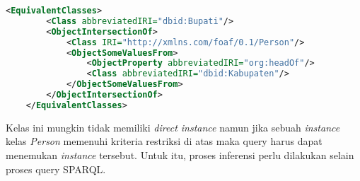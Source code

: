 \begin{lstlisting}[language=XML,xleftmargin=0pt]
    <EquivalentClasses>
        <Class abbreviatedIRI="dbid:Bupati"/>
        <ObjectIntersectionOf>
            <Class IRI="http://xmlns.com/foaf/0.1/Person"/>
            <ObjectSomeValuesFrom>
                <ObjectProperty abbreviatedIRI="org:headOf"/>
                <Class abbreviatedIRI="dbid:Kabupaten"/>
            </ObjectSomeValuesFrom>
        </ObjectIntersectionOf>
    </EquivalentClasses>
\end{lstlisting}

Kelas ini mungkin tidak memiliki \emph{direct instance} namun jika sebuah \emph{instance} kelas \emph{Person} memenuhi kriteria restriksi di atas maka query harus dapat menemukan \emph{instance} tersebut. Untuk itu, proses inferensi perlu dilakukan selain proses query SPARQL.







